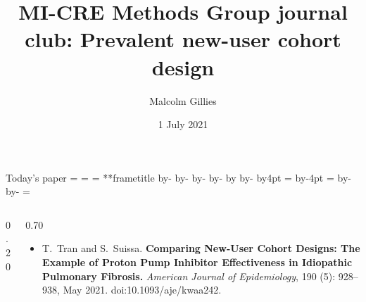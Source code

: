 \documentclass[aspectratio=169,12pt]{beamer} %
\title{MI-CRE Methods Group journal club: Prevalent new-user cohort design}
\author{Malcolm Gillies}
\date{1 July 2021}
\makeatletter
\newif\ifsidebartheme
\newcommand*{\calculatespace}{%
    \contentheight=\paperheight%
    \ifx\beamer@frametitle\@empty%
        \setbox\@tempboxa=\box\voidb@x%
      \else%
        \setbox\@tempboxa=\vbox{%
          \vbox{}%
          {\parskip0pt\usebeamertemplate***{frametitle}}%
        }%
        \ifsidebartheme%
          \advance\contentheight by-1em%
        \fi%
      \fi%
    \advance\contentheight by-\ht\@tempboxa%
    \advance\contentheight by-\dp\@tempboxa%
    \advance\contentheight by-\beamer@frametopskip%
    \ifbeamer@plainframe%
    \contentbottom=0pt%
    \else%
    \advance\contentheight by-\headheight%
    \advance\contentheight by\headdp%
    \advance\contentheight by-\footheight%
    \advance\contentheight by4pt%
    \contentbottom=\footheight%
    \advance\contentbottom by-4pt%
    \fi%
    \contentwidth=\paperwidth%
    \ifbeamer@plainframe%
    \contentleft=0pt%
    \else%
    \advance\contentwidth by-\beamer@rightsidebar%
    \advance\contentwidth by-\beamer@leftsidebar\relax%
    \contentleft=\beamer@leftsidebar%
    \fi%
}
\makeatother
\begin{document}
{
\begin{frame}
\titlepage
\end{frame}
}

\begin{frame}{Today's paper}
\calculatespace%
\begin{columns}
\begin{column}{0.20\contentwidth}
\end{column}
\begin{column}{0.70\contentwidth}
	\begin{itemize}
		\item T.~Tran and S.~Suissa. \textbf{Comparing {New}-{User} {Cohort} {Designs}: {The} {Example} of {Proton} {Pump} {Inhibitor} {Effectiveness} in {Idiopathic} {Pulmonary} {Fibrosis}.} \emph{American Journal of Epidemiology}, 190 (5): 928--938, May 2021. doi:10.1093/aje/kwaa242.
\nocite{tran_comparing_2021}
	\end{itemize}
\end{column}
\end{columns}
\end{frame}
\end{document}
